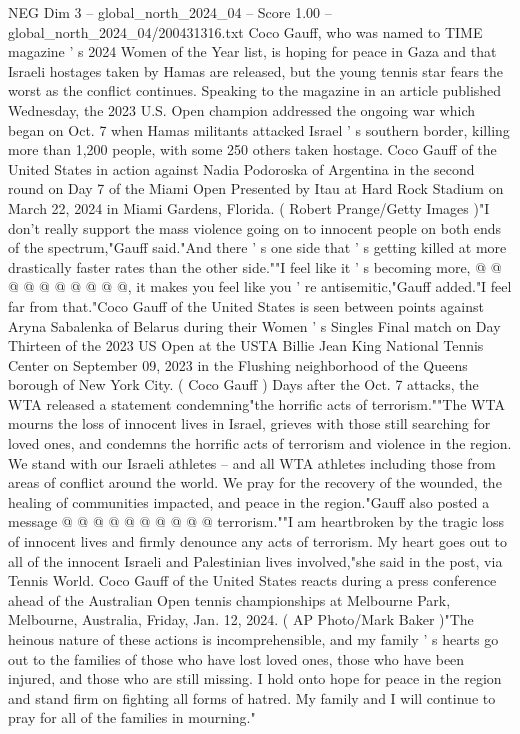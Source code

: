 \begin{textsample}{NEG Dim 3 – global\_north\_2024\_04 – Score 1.00 – global\_north\_2024\_04/200431316.txt}  \label{ex:f3_neg_403}
Coco Gauff, who was named to TIME magazine ' s 2024 Women of the Year list, is hoping for peace in Gaza and that Israeli hostages taken by Hamas are released, but the young tennis star fears the worst as the conflict continues.
Speaking to the magazine in an article published Wednesday, the 2023 U.S.
Open champion addressed the ongoing war which began on Oct. 7 when Hamas militants attacked Israel ' s southern border, killing more than 1,200 people, with some 250 others taken hostage.
Coco Gauff of the United States in action against Nadia Podoroska of Argentina in the second round on Day 7 of the Miami Open Presented by Itau at Hard Rock Stadium on March 22, 2024 in Miami Gardens, Florida. ( Robert Prange/Getty Images )"I don't really support the mass violence going on to innocent people on both ends of the spectrum,"Gauff said."And there ' s one side that ' s getting killed at more drastically faster rates than the other side.""I feel like it ' s becoming more, @ @ @ @ @ @ @ @ @ @, it makes you feel like you ' re antisemitic,"Gauff added."I feel far from that."Coco Gauff of the United States is seen between points against Aryna Sabalenka of Belarus during their Women ' s Singles Final match on Day Thirteen of the 2023 US Open at the USTA Billie Jean King National Tennis Center on September 09, 2023 in the Flushing neighborhood of the Queens borough of New York City. ( Coco Gauff ) Days after the Oct. 7 attacks, the WTA released a statement condemning"the horrific acts of terrorism.""The WTA mourns the loss of innocent lives in Israel, grieves with those still searching for loved ones, and condemns the horrific acts of terrorism and violence in the region.
We stand with our Israeli athletes -- and all WTA athletes including those from areas of conflict around the world.
We pray for the recovery of the wounded, the healing of communities impacted, and peace in the region."Gauff also posted a message @ @ @ @ @ @ @ @ @ @ terrorism.""I am heartbroken by the tragic loss of innocent lives and firmly denounce any acts of terrorism.
My heart goes out to all of the innocent Israeli and Palestinian lives involved,"she said in the post, via Tennis World.
Coco Gauff of the United States reacts during a press conference ahead of the Australian Open tennis championships at Melbourne Park, Melbourne, Australia, Friday, Jan. 12, 2024. ( AP Photo/Mark Baker )"The heinous nature of these actions is incomprehensible, and my family ' s hearts go out to the families of those who have lost loved ones, those who have been injured, and those who are still missing.
I hold onto hope for peace in the region and stand firm on fighting all forms of hatred.
My family and I will continue to pray for all of the families in mourning."

\end{textsample}
